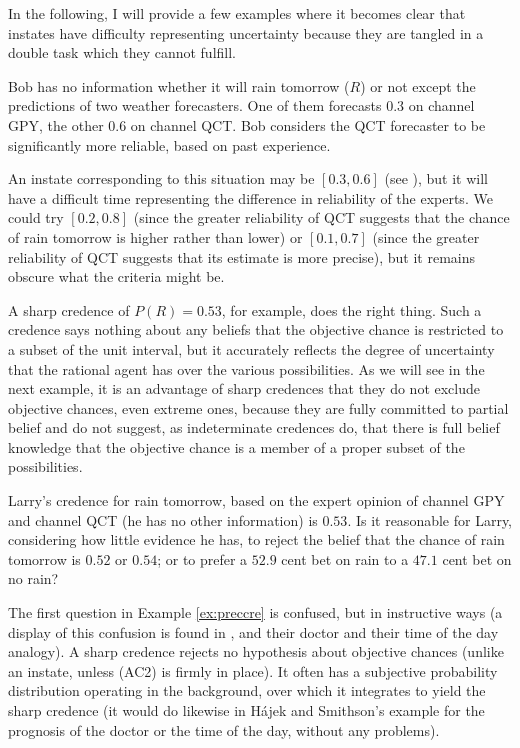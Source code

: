 \documentclass[11pt]{article}
\begin{document}
In the following, I will provide a few examples where it becomes clear
that instates have difficulty representing uncertainty because they
are tangled in a double task which they cannot fulfill.

\begin{quotex}
  \label{ex:aggreg} Bob has no
  information whether it will rain tomorrow ($R$) or not except the
  predictions of two weather forecasters. One of them forecasts 0.3 on
  channel GPY, the other 0.6 on channel QCT. Bob considers the QCT
  forecaster to be significantly more reliable, based on past
  experience.
\end{quotex}

An instate corresponding to this situation may be $[0.3,0.6]$ (see
), but it will have a difficult time
representing the difference in reliability of the experts. We could
try $[0.2,0.8]$ (since the greater reliability of QCT suggests that
the chance of rain tomorrow is higher rather than lower) or
$[0.1,0.7]$ (since the greater reliability of QCT suggests that its
estimate is more precise), but it remains obscure what the criteria
might be.

A sharp credence of $P(R)=0.53$, for example, does the right thing.
Such a credence says nothing about any beliefs that the objective
chance is restricted to a subset of the unit interval, but it
accurately reflects the degree of uncertainty that the rational agent
has over the various possibilities. As we will see in the next
example, it is an advantage of sharp credences that they do not
exclude objective chances, even extreme ones, because they are fully
committed to partial belief and do not suggest, as indeterminate
credences do, that there is full belief knowledge that the objective
chance is a member of a proper subset of the possibilities.

\begin{quotex}
  \label{ex:preccre} Larry's credence for
  rain tomorrow, based on the expert opinion of channel GPY and
  channel QCT (he has no other information) is $0.53$. Is it
  reasonable for Larry, considering how little evidence he has, to
  reject the belief that the chance of rain tomorrow is $0.52$ or
  $0.54$; or to prefer a $52.9$ cent bet on rain to a $47.1$ cent bet
  on no rain?
\end{quotex}

The first question in Example \ref{ex:preccre} is confused, but in
instructive ways (a display of this confusion is found in
, and their doctor and their time of
the day analogy). A sharp credence rejects no hypothesis about
objective chances (unlike an instate, unless (AC2) is firmly in
place). It often has a subjective probability distribution operating
in the background, over which it integrates to yield the sharp
credence (it would do likewise in H{\'a}jek and Smithson's example for
the prognosis of the doctor or the time of the day, without any
problems).
\end{document}
